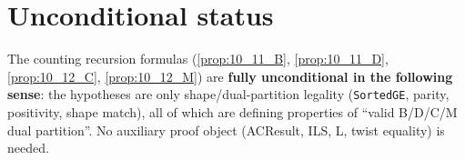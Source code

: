 \section{Unconditional status}

The counting recursion formulas (\ref{prop:10_11_B}, \ref{prop:10_11_D},
\ref{prop:10_12_C}, \ref{prop:10_12_M}) are \textbf{fully unconditional in the
following sense}: the hypotheses are only shape/dual-partition legality
(\texttt{SortedGE}, parity, positivity, shape match), all of which are
defining properties of ``valid B/D/C/M dual partition''. No auxiliary proof
object (ACResult, ILS, L, twist equality) is needed.
